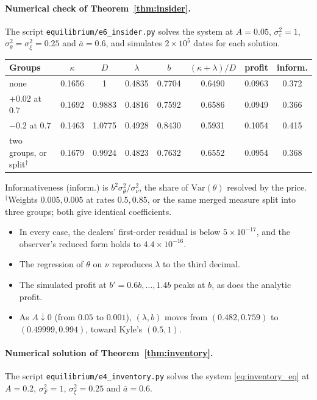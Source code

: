 \documentclass[12pt]{article}
\theoremstyle{definition}
\theoremstyle{remark}
\begin{document}
\paragraph{Numerical check of Theorem~\ref{thm:insider}.} The script \nolinkurl{equilibrium/e6_insider.py} solves the system at $A=0.05$, $\sigma_\varepsilon^2=1$, $\sigma_\theta^2=\sigma_\xi^2=0.25$ and $\bar a=0.6$, and simulates $2\times10^5$ dates for each solution.
\begin{center}\footnotesize\setlength{\tabcolsep}{3pt}
\begin{tabular}{lccccccc}
\hline
Groups & $\kappa$ & $D$ & $\lambda$ & $b$ & $(\kappa+\lambda)/D$ & profit & inform.\\
\hline
none & 0.1656 & 1 & 0.4835 & 0.7704 & 0.6490 & 0.0963 & 0.372\\
$+0.02$ at $0.7$ & 0.1692 & 0.9883 & 0.4816 & 0.7592 & 0.6586 & 0.0949 & 0.366\\
$-0.2$ at $0.7$ & 0.1463 & 1.0775 & 0.4928 & 0.8430 & 0.5931 & 0.1054 & 0.415\\
two groups, or split$^\dagger$ & 0.1679 & 0.9924 & 0.4823 & 0.7632 & 0.6552 & 0.0954 & 0.368\\
\hline
\end{tabular}
\end{center}
Informativeness (inform.) is $b^2\sigma_\theta^2/\sigma_\nu^2$, the share of $\mathrm{Var}(\theta)$ resolved by the price. $^\dagger$Weights $0.005,0.005$ at rates $0.5,0.85$, or the same merged measure split into three groups; both give identical coefficients.
\begin{itemize}[itemsep=1pt,topsep=2pt]
\item In every case, the dealers' first-order residual is below $5\times10^{-17}$, and the observer's reduced form holds to $4.4\times10^{-16}$.
\item The regression of $\theta$ on $\nu$ reproduces $\lambda$ to the third decimal.
\item The simulated profit at $b'=0.6b,\ldots,1.4b$ peaks at $b$, as does the analytic profit.
\item As $A\downarrow0$ (from $0.05$ to $0.001$), $(\lambda,b)$ moves from $(0.482,0.759)$ to $(0.49999,0.994)$, toward Kyle's $(0.5,1)$.
\end{itemize}

\paragraph{Numerical solution of Theorem~\ref{thm:inventory}.} The script \nolinkurl{equilibrium/e4_inventory.py} solves the system \eqref{eq:inventory_eq} at $A=0.2$, $\sigma_F^2=1$, $\sigma_\xi^2=0.25$ and $\bar a=0.6$.
\end{document}
